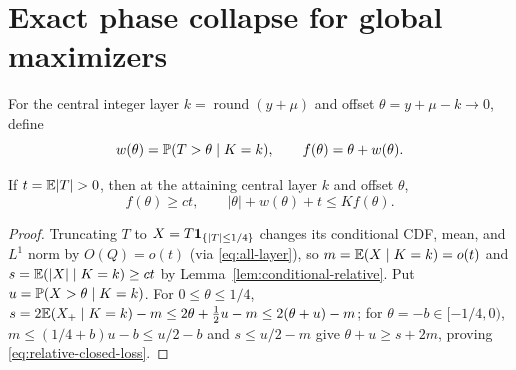 \section{Exact phase collapse for global maximizers}\label{sec:comparison}

For the central integer layer $k=\operatorname{round}(y+\mu)$ and offset
$\theta=y+\mu-k\to0$, define
\[
 w(\theta)=\mathbb P(T>\theta\mid K=k),\qquad
                        f(\theta)=\theta+w(\theta).
\]

\begin{lemma}\label{lem:closed-loss}
If $t=\E|T|>0$, then at the attaining central layer $k$ and offset $\theta$,
\begin{equation}\label{eq:relative-closed-loss}
        f(\theta)\ge ct,\qquad
                   |\theta|+w(\theta)+t\le K f(\theta).
\end{equation}
\end{lemma}
\begin{proof}
Truncating $T$ to $X=T\mathbf1_{\{|T|\le1/4\}}$ changes its conditional CDF,
mean, and $L^1$ norm by $O(Q)=o(t)$ (via \eqref{eq:all-layer}), so
$m=\mathbb E(X\mid K=k)=o(t)$ and $s=\mathbb E(|X|\mid K=k)\ge ct$ by
Lemma~\ref{lem:conditional-relative}. Put $u=\mathbb P(X>\theta\mid K=k)$. For
$0\le\theta\le1/4$,
$s=2\mathbb E(X_+\mid K=k)-m\le2\theta+\frac12u-m\le2(\theta+u)-m$;
for $\theta=-b\in[-1/4,0)$, $m\le(1/4+b)u-b\le u/2-b$ and $s\le u/2-m$ give
$\theta+u\ge s+2m$, proving \eqref{eq:relative-closed-loss}.
\end{proof}

